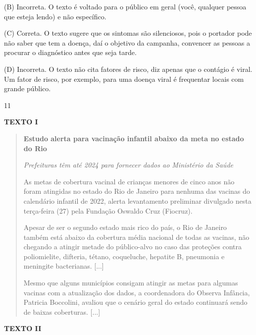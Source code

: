 (B) Incorreta. O texto é voltado para o público em geral (você, qualquer
pessoa que esteja lendo) e não específico.

(C) Correta. O texto sugere que os sintomas são silenciosos, pois o
portador pode não saber que tem a doença, daí o objetivo da campanha,
convencer as pessoas a procurar o diagnóstico antes que seja tarde.

(D) Incorreta. O texto não cita fatores de risco, diz apenas que o
contágio é viral. Um fator de risco, por exemplo, para uma doença viral
é frequentar locais com grande público.

\num{11}

\textbf{TEXTO I}

\begin{quote}
\textbf{Estudo alerta para vacinação infantil abaixo da meta no estado
do Rio}

\emph{Prefeituras têm até 2024 para fornecer dados ao Ministério da
Saúde}

As metas de cobertura vacinal de crianças menores de cinco anos não
foram atingidas no estado do Rio de Janeiro para nenhuma das vacinas do
calendário infantil de 2022, alerta levantamento preliminar divulgado
nesta terça-feira (27) pela Fundação Oswaldo Cruz (Fiocruz).

Apesar de ser o segundo estado mais rico do país, o Rio de Janeiro
também está abaixo da cobertura média nacional de todas as vacinas, não
chegando a atingir metade do público-alvo no caso das proteções contra
poliomielite, difteria, tétano, coqueluche, hepatite B, pneumonia e
meningite bacterianas. {[}...{]}

Mesmo que alguns municípios consigam atingir as metas para algumas
vacinas com a atualização dos dados, a coordenadora do Observa Infância,
Patricia Boccolini, avaliou que o cenário geral do estado continuará
sendo de baixas coberturas. {[}...{]}

\end{quote}

\textbf{TEXTO II}

